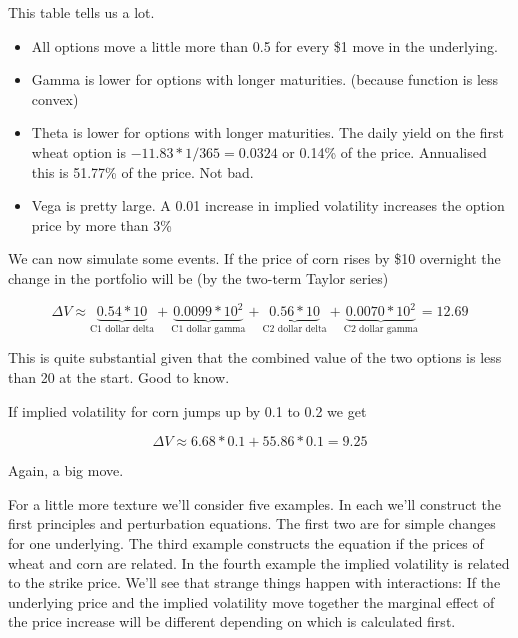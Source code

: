 This table tells us a lot.

\begin{itemize}
\item  All options move a little more than 0.5 for every \$1 move in the underlying. 
\item  Gamma is lower for options with longer maturities. (because function is less convex)
\item Theta is lower for options with longer maturities. The daily yield on the first wheat option is $-11.83*1/365 = 0.0324$ or 0.14\% of the price.  Annualised this is 51.77\% of the price. Not bad. 
\item Vega is pretty large. A 0.01 increase in implied volatility increases the option price by more than 3\%
\end{itemize}


We can now simulate some events. If the price of corn rises by \$10 overnight the change in the portfolio will be (by the two-term Taylor series)

\[ \Delta V \approx \underbrace{0.54*10}_{\mbox{C1 dollar delta}}+\underbrace{0.0099*10^2}_{\mbox{C1 dollar gamma}}+  \underbrace{0.56*10}_{\mbox{C2 dollar delta}}+\underbrace{0.0070*10^2}_{\mbox{C2 dollar gamma}} = 12.69  \]

This is quite substantial given that the combined value of the two options is less than 20 at the start. Good to know.

If implied volatility for corn jumps up by 0.1 to 0.2  we get

\[\Delta V  \approx 6.68*0.1+55.86*0.1 = 9.25 \]

Again, a big move.

For a little more texture we'll consider five examples. In each we'll construct the first principles and perturbation equations. The first two are for simple changes for one underlying. The third example constructs the equation if the prices of wheat and corn are related. In the fourth example the implied volatility is related to the strike price.  We'll see that strange things happen with interactions: If the underlying price and the implied volatility move together the marginal effect of the price increase will be different depending on which is calculated first. 


